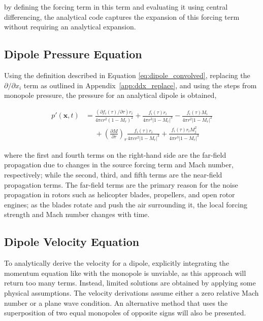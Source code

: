 by defining the forcing term in this term and evaluating it using central differencing, the analytical code captures the expansion of this forcing term without requiring an analytical expansion.

\subsection{Dipole Pressure Equation} \label{subsec:dipole_p}

Using the definition described in Equation \ref{eq:dipole_convolved}, replacing the $\partial / \partial x_i$ term as outlined in Appendix~\ref{app:ddx_replace}, and using the steps from monopole pressure, the pressure for an analytical dipole is obtained,

\begin{equation}
\begin{split}
    p'(\bm{x}, t) &= \frac{(\partial f_i(\tau)/\partial \tau) r_i}{4\pi cr^2(1-M_r)^2}
    + \frac{f_i(\tau)r_i}{4\pi r^3 |1-M_r|^3}
    - \frac{f_i(\tau)M_i}{4\pi r^2 |1-M_r|^2} \\
    &\phantom{=} + \left( \frac{\partial M}{\partial \tau}\right)_r \frac{f_i(\tau)r_i}{4\pi cr^2|1-M_r|^3}
    + \frac{f_i(\tau)r_iM_j^2}{4\pi r^3 |1-M_r|^3}
    \label{eq:dipole_pressure}
\end{split}
\end{equation}

where the first and fourth terms on the right-hand side are the far-field propagation due to changes in the source forcing term and Mach number, respectively; while the second, third, and fifth terms are the near-field propagation terms. The far-field terms are the primary reason for the noise propagation in rotors such as helicopter blades, propellers, and open rotor engines; as the blades rotate and push the air surrounding it, the local forcing strength and Mach number changes with time.

\subsection{Dipole Velocity Equation} \label{subsec:dipole_u}
To analytically derive the velocity for a dipole, explicitly integrating the momentum equation like with the monopole is unviable, as this approach will return too many terms. Instead, limited solutions are obtained by applying some physical assumptions. The velocity derivations assume either a zero relative Mach number or a plane wave condition. An alternative method that uses the superposition of two equal monopoles of opposite signs will also be presented.

